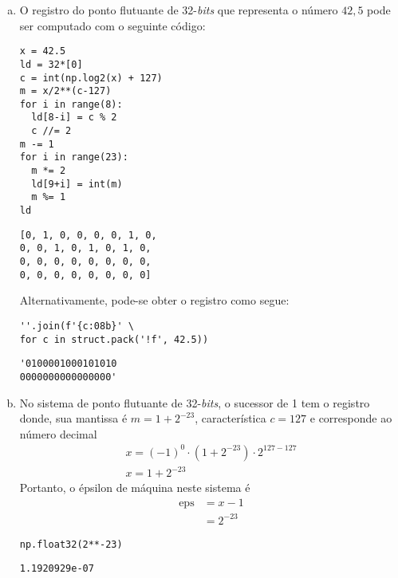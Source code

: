 \begin{resol}
  \begin{enumerate}[a)]
  \item O registro do ponto flutuante de 32-{\it bits} que representa o número $42,5$ pode ser computado com o seguinte código:

\begin{lstlisting}
x = 42.5
ld = 32*[0]
c = int(np.log2(x) + 127)
m = x/2**(c-127)
for i in range(8):
  ld[8-i] = c % 2
  c //= 2
m -= 1
for i in range(23):
  m *= 2
  ld[9+i] = int(m)
  m %= 1
ld
\end{lstlisting}

\begin{verbatim}
[0, 1, 0, 0, 0, 0, 1, 0,
0, 0, 1, 0, 1, 0, 1, 0,
0, 0, 0, 0, 0, 0, 0, 0,
0, 0, 0, 0, 0, 0, 0, 0]
\end{verbatim}

Alternativamente, pode-se obter o registro como segue:

\begin{lstlisting}
''.join(f'{c:08b}' \
for c in struct.pack('!f', 42.5))
\end{lstlisting}

\begin{verbatim}
'0100001000101010
0000000000000000'
\end{verbatim}

  \item No sistema de ponto flutuante de 32-{\it bits}, o sucessor de 1 tem o registro
    \begin{equation}
      [0 ~ | ~ 0 ~ 1 ~ 1 ~ \ldots ~ 1 ~ | ~ 0 ~ 0 ~ \ldots ~ 0 ~ 1]
    \end{equation}
    donde, sua mantissa é $m = 1 + 2^{-23}$, característica $c = 127$ e corresponde ao número decimal
    \begin{gather}
      x = (-1)^0\cdot (1 + 2^{-23})\cdot 2^{127-127}\\
      x = 1 + 2^{-23}
    \end{gather}
    Portanto, o épsilon de máquina neste sistema é
    \begin{align}
      \mathrm{eps} &= x - 1\\
                   &= 2^{-23}
    \end{align}

\begin{lstlisting}
np.float32(2**-23)
\end{lstlisting}

\begin{verbatim}
1.1920929e-07
\end{verbatim}

  \end{enumerate}
\end{resol}

